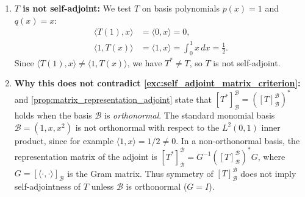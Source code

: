 \begin{exercisesolution}
\label{sol:self_adjoint_non_orthonormal_basis}
\begin{enumerate}[label=\textbf{(\alph*)}]
    \item \textbf{$T$ is not self-adjoint:}
    We test $T$ on basis polynomials $p(x) = 1$ and $q(x) = x$:
    \begin{align*}
    \langle T(1), x \rangle &= \langle 0, x \rangle = 0, \\
    \langle 1, T(x) \rangle &= \langle 1, x \rangle = \int_0^1 x \, dx = \frac{1}{2}.
    \end{align*}
    Since $\langle T(1), x \rangle \ne \langle 1, T(x) \rangle$, we have $T^* \ne T$, so $T$ is not self-adjoint.

    \item \textbf{Why this does not contradict \cref{exc:self_adjoint_matrix_criterion}:}
     and \cref{prop:matrix_representation_adjoint} state that $[T^*]_\mathcal{B}^\mathcal{B} = ([T]_\mathcal{B}^\mathcal{B})^*$ holds when the basis $\mathcal{B}$ is \emph{orthonormal}.
    The standard monomial basis $\mathcal{B} = (1, x, x^2)$ is not orthonormal with respect to the $L^2(0, 1)$ inner product, since for example $\langle 1, x \rangle = 1/2 \ne 0$.
    In a non-orthonormal basis, the representation matrix of the adjoint is $[T^*]_\mathcal{B}^\mathcal{B} = G^{-1} ([T]_\mathcal{B}^\mathcal{B})^* G$, where $G = [\langle \cdot, \cdot \rangle]_\mathcal{B}$ is the Gram matrix.
    Thus symmetry of $[T]_\mathcal{B}^\mathcal{B}$ does not imply self-adjointness of $T$ unless $\mathcal{B}$ is orthonormal ($G = I$). \qedhere
\end{enumerate}
\end{exercisesolution}

